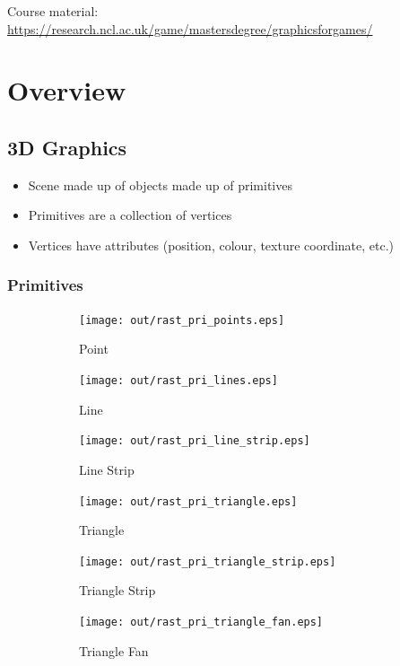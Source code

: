 \documentclass[a4paper]{article}
\begin{document}
\tableofcontents

\vfill
Course material:
\url{https://research.ncl.ac.uk/game/mastersdegree/graphicsforgames/}

\section{Overview}

\subsection{3D Graphics}

\begin{itemize}
  \item
    Scene made up of objects made up of primitives

  \item
    Primitives are a collection of vertices

  \item
    Vertices have attributes (position, colour, texture coordinate, etc.)

\end{itemize}

\subsubsection{Primitives}

\begin{figure}[h]
  \centering

  \begin{subfigure}[b]{0.3\textwidth}
    \texttt{[image: out/rast\_pri\_points.eps]}
    \caption{Point}
  \end{subfigure}
  \begin{subfigure}[b]{0.3\textwidth}
    \texttt{[image: out/rast\_pri\_lines.eps]}
    \caption{Line}
  \end{subfigure}
  \begin{subfigure}[b]{0.3\textwidth}
    \texttt{[image: out/rast\_pri\_line\_strip.eps]}
    \caption{Line Strip}
  \end{subfigure}

  \vspace{2em}

  \begin{subfigure}[b]{0.3\textwidth}
    \texttt{[image: out/rast\_pri\_triangle.eps]}
    \caption{Triangle}
  \end{subfigure}
  \begin{subfigure}[b]{0.3\textwidth}
    \texttt{[image: out/rast\_pri\_triangle\_strip.eps]}
    \caption{Triangle Strip}
  \end{subfigure}
  \begin{subfigure}[b]{0.3\textwidth}
    \texttt{[image: out/rast\_pri\_triangle\_fan.eps]}
    \caption{Triangle Fan}
  \end{subfigure}

  \caption{}
  \label{fig:primitives}
\end{figure}
\FloatBarrier
\end{document}
